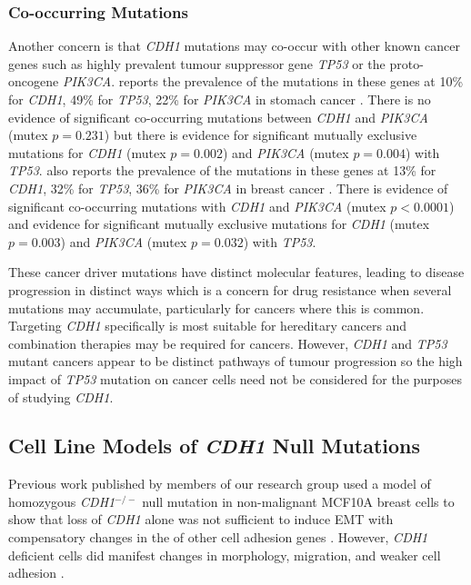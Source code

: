 \subsubsection{Co-occurring Mutations}

Another concern is that \textit{CDH1} \glspl{mutation} may co-occur with other known cancer  genes such as highly prevalent \gls{tumour suppressor} gene \textit{\textit{TP53}} or the proto-oncogene \textit{\textit{PIK3CA}}. \citet{cBioPortal} reports the prevalence of the \glspl{mutation} in these genes at 10\% for \textit{CDH1}, 49\% for \textit{\textit{TP53}}, 22\% for \textit{\textit{PIK3CA}} in stomach cancer \citep[393 samples]{TCGA2017prov}. There is no evidence of significant co-occurring \glspl{mutation} between \textit{CDH1} and \textit{\textit{PIK3CA}} (mutex $p=0.231$) but there is evidence for significant mutually exclusive \glspl{mutation} for \textit{CDH1} (mutex $p=0.002$) and \textit{\textit{PIK3CA}} (mutex $p=0.004$) with \textit{\textit{TP53}}. \citet{cBioPortal} also reports the prevalence of the \glspl{mutation} in these genes at 13\% for \textit{CDH1}, 32\% for \textit{\textit{TP53}}, 36\% for \textit{\textit{PIK3CA}} in breast cancer \citep[963 samples]{TCGA2017prov}. There is evidence of significant co-occurring \glspl{mutation} with \textit{CDH1} and \textit{\textit{PIK3CA}} (mutex $p<0.0001$) and evidence for significant mutually exclusive \glspl{mutation} for \textit{CDH1} (mutex $p=0.003$) and \textit{\textit{PIK3CA}} (mutex $p=0.032$) with \textit{\textit{TP53}}.

These cancer \glspl{driver mutation} have distinct molecular features, leading to disease progression in distinct ways which is a concern for drug resistance when several \glspl{mutation} may accumulate, particularly for  cancers where this is common. Targeting \textit{CDH1} specifically is most suitable for \gls{hereditary} cancers and combination therapies may be required for  cancers. However, \textit{CDH1} and \textit{\textit{TP53}} \gls{mutant} cancers appear to be distinct pathways of tumour progression so the high impact of \textit{\textit{TP53}} \gls{mutation} on cancer cells need not be considered for the purposes of studying \textit{CDH1}.
\fi

\subsection{Cell Line Models of \textit{CDH1} Null Mutations}
Previous work published by members of our research group used a model of  homozygous \textit{CDH1}$^{-/-}$ null \gls{mutation} in non-malignant MCF10A breast cells to show that loss of \textit{CDH1} alone was not sufficient to induce \gls{EMT} with compensatory changes in the  of other cell adhesion genes \citep{Chen2014}. However, \textit{CDH1} deficient cells did manifest changes in morphology, migration, and weaker cell adhesion \citep{Chen2014}.


